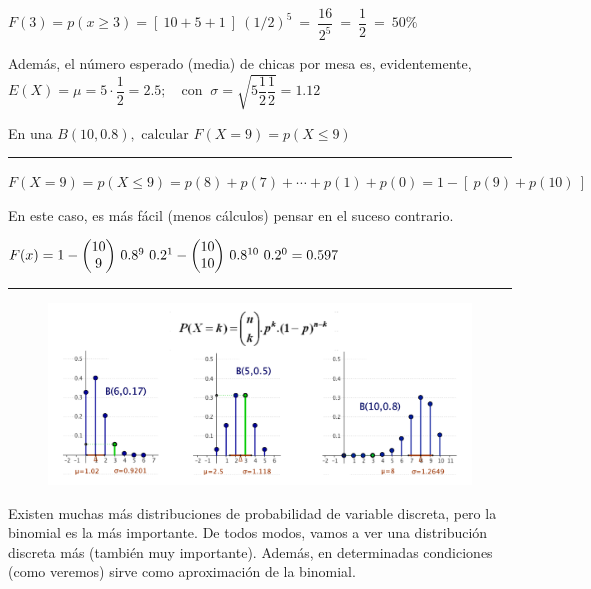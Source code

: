 \begin{ejemplo}
$F(3)=p(x\ge 3)=[\ 10+5+1  \ ] \ (1/2)^5 \ = \ \dfrac{16}{2^5}\ = \ \dfrac 1 2 \ = \ 50\%$

\vspace{2mm} Además, el número esperado (media) de  chicas por mesa es, evidentemente,  
$E(X)=\mu=5\cdot \dfrac 1 2 = 2.5;\quad \text{con } \ \sigma=\sqrt{5\dfrac 1 2 \dfrac 1 2}=1.12$

\end{ejemplo}



\vspace{4mm} \begin{ejemplo}
	\begin{ejre}
		En una $B(10,0.8), \text{ calcular } F(X=9)=p(X\le 9)$
	\end{ejre}
\textcolor{gris}{\rule{75mm}{0.1mm}}

$F(X=9)=p(X\le 9)=p(8)+p(7)+\cdots +p(1)+p(0)=1-[ \ p(9)+p(10) \ ]$

En este caso, es más fácil (menos cálculos) pensar en el suceso contrario.

$F(x)=1-\mqty(10\\9)\ 0.8^9\ 0.2^1 - \mqty(10\\10)\ 0.8^{10}\ 0.2^0=0.597$

\end{ejemplo}

\begin{center} \textcolor{gris}{\rule{150mm}{0.1mm}} \end{center}

	\begin{figure}[H]
	\centering
	\includegraphics[width=1\textwidth]{imagenes/imagenes04/T04IM09.png}
	\end{figure}

Existen muchas más distribuciones de probabilidad de variable discreta, pero la binomial es la más importante. De todos modos, vamos a ver una distribución discreta más (también muy importante). Además, en determinadas condiciones (como veremos) sirve como aproximación de la binomial.

